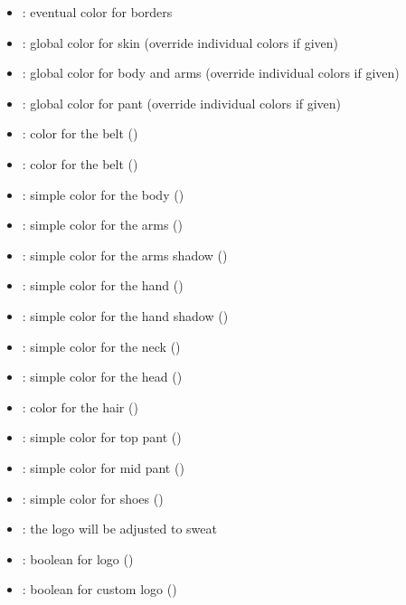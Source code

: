 \documentclass[11pt,a4paper]{ltxdoc}
\begin{document}
\begin{itemize}[leftmargin=*,itemsep=1pt]
	\item {}: eventual color for borders
	\item {}: global color for skin (override individual colors if given)
	\item {}: global color for body and arms (override individual colors if given)
	\item {}: global color for pant (override individual colors if given)
	\item {}: color for the belt ()
	\item {}: color for the belt ()
	\item {}: simple color for the body ()
	\item {}: simple color for the arms ()
	\item {}: simple color for the arms shadow ()
	\item {}: simple color for the hand ()
	\item {}: simple color for the hand shadow ()
	\item {}: simple color for the neck ()
	\item {}: simple color for the head ()
	\item {}: color for the hair ()
	\item {}: simple color for top pant ()
	\item {}: simple color for mid pant ()
	\item {}: simple color for shoes ()
	\item {}: the logo will be adjusted to sweat
	\item {}: boolean for logo ()
	\item {}: boolean for custom logo ()

\end{itemize}
\end{document}
